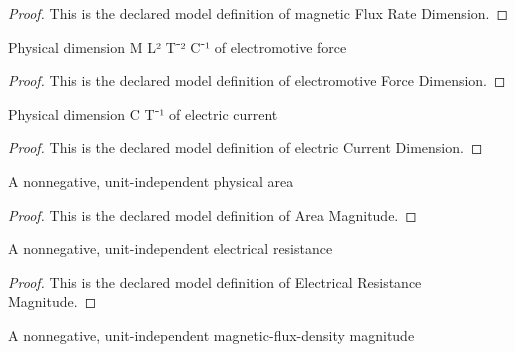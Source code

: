\begin{proof}
  This is the declared model definition of magnetic Flux Rate Dimension.
\end{proof}
\begin{definition}
  \label{def:physics:phyx-mini-0917:phyxminiproblems-problemphyxmini0917-electromotiveforcedimension}
  Physical dimension M L² T⁻² C⁻¹ of electromotive force
\end{definition}
\begin{proof}
  This is the declared model definition of electromotive Force Dimension.
\end{proof}
\begin{definition}
  \label{def:physics:phyx-mini-0917:phyxminiproblems-problemphyxmini0917-electriccurrentdimension}
  Physical dimension C T⁻¹ of electric current
\end{definition}
\begin{proof}
  This is the declared model definition of electric Current Dimension.
\end{proof}
\begin{definition}
  \label{def:physics:phyx-mini-0917:phyxminiproblems-problemphyxmini0917-areamagnitude}
  A nonnegative, unit-independent physical area
\end{definition}
\begin{proof}
  This is the declared model definition of Area Magnitude.
\end{proof}
\begin{definition}
  \label{def:physics:phyx-mini-0917:phyxminiproblems-problemphyxmini0917-electricalresistancemagnitude}
  A nonnegative, unit-independent electrical resistance
\end{definition}
\begin{proof}
  This is the declared model definition of Electrical Resistance Magnitude.
\end{proof}
\begin{definition}
  \label{def:physics:phyx-mini-0917:phyxminiproblems-problemphyxmini0917-magneticfluxdensitymagnitude}
  A nonnegative, unit-independent magnetic-flux-density magnitude
\end{definition}
